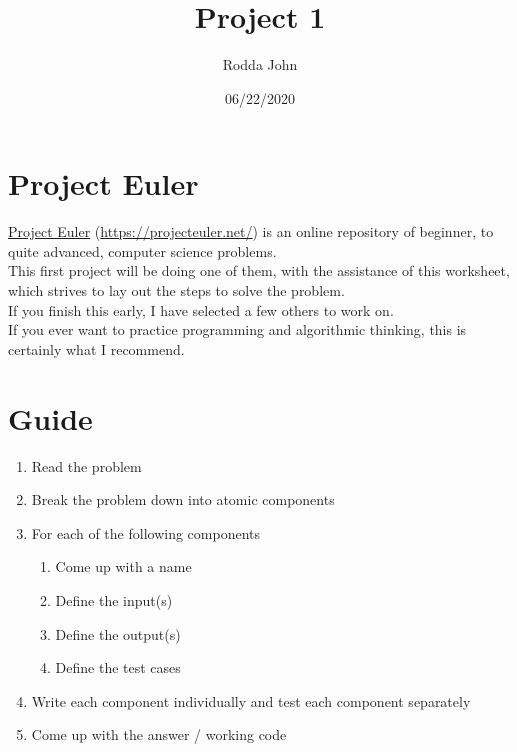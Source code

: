 \documentclass[11pt]{article}
\author{Rodda John}
\date{06/22/2020}
\title{Project 1}
\begin{document}
\maketitle
\setlength\parindent{0pt}

\section{Project Euler}
\label{sec:orge4bed7d}
\href{https://projecteuler.net/}{Project Euler} (\href{https://projecteuler.net/}{https://projecteuler.net/}) is an online repository of beginner, to quite advanced, computer science problems.\\

This first project will be doing one of them, with the assistance of this worksheet, which strives to lay out the steps to solve the problem.\\

If you finish this early, I have selected a few others to work on.\\

If you ever want to practice programming and algorithmic thinking, this is certainly what I recommend.\\
\section{Guide}
\label{sec:orgab8dcbe}
\begin{enumerate}
\item Read the problem\\
\item Break the problem down into atomic components\\
\item For each of the following components\\
\begin{enumerate}
\item Come up with a name\\
\item Define the input(s)\\
\item Define the output(s)\\
\item Define the test cases\\
\end{enumerate}
\item Write each component individually and test each component separately\\
\item Come up with the answer / working code\\
\end{enumerate}
\end{document}

